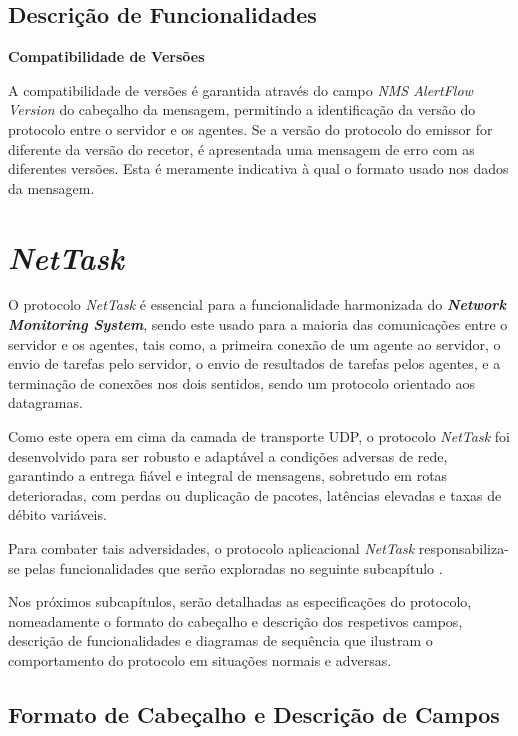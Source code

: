 \documentclass[a4paper,12pt]{scrreprt}
\begin{document}
\subsection{Descrição de Funcionalidades}

\textbf{Compatibilidade de Versões}

A compatibilidade de versões é garantida através do campo \textit{NMS AlertFlow Version}
do cabeçalho da mensagem, permitindo a identificação da versão do protocolo entre o
servidor e os agentes. Se a versão do protocolo do emissor for diferente da versão do
recetor, é apresentada uma mensagem de erro com as diferentes versões. Esta é meramente
indicativa à qual o formato usado nos dados da mensagem.

\clearpage

\section{\textit{NetTask}}

O protocolo \textit{NetTask} é essencial para a funcionalidade harmonizada do
\textbf{\textit{Network Monitoring System}}, sendo este usado para a maioria
das comunicações entre o servidor e os agentes, tais como, a primeira conexão de
um agente ao servidor, o envio de tarefas pelo servidor, o envio de resultados
de tarefas pelos agentes, e a terminação de conexões nos dois sentidos, sendo
um protocolo orientado aos datagramas.

Como este opera em cima da camada de transporte UDP, o protocolo \textit{NetTask}
foi desenvolvido para ser robusto e adaptável a condições adversas de rede,
garantindo a entrega fiável e integral de mensagens, sobretudo em rotas deterioradas,
com perdas ou duplicação de pacotes, latências elevadas e taxas de débito variáveis.

Para combater tais adversidades, o protocolo aplicacional \textit{NetTask}
responsabiliza-se pelas funcionalidades que serão exploradas no seguinte
subcapítulo .

Nos próximos subcapítulos, serão detalhadas as especificações do protocolo,
nomeadamente o formato do cabeçalho e descrição dos respetivos campos,
descrição de funcionalidades e diagramas de sequência que ilustram o
comportamento do protocolo em situações normais e adversas.

\subsection{Formato de Cabeçalho e Descrição de Campos}
\end{document}
